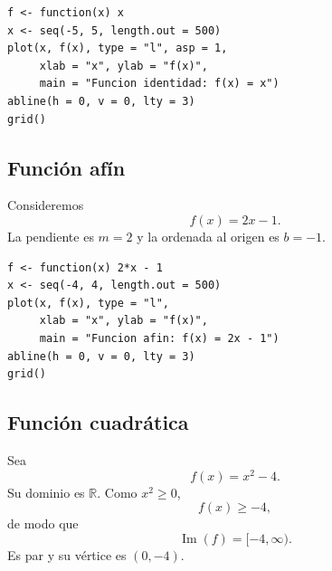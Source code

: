 \documentclass[12pt]{article}
\theoremstyle{remark}
\newcommand{\R}{\mathbb{R}}
\newcommand{\Ima}{\operatorname{Im}}
\begin{document}
\begin{verbatim}
f <- function(x) x
x <- seq(-5, 5, length.out = 500)
plot(x, f(x), type = "l", asp = 1,
     xlab = "x", ylab = "f(x)",
     main = "Funcion identidad: f(x) = x")
abline(h = 0, v = 0, lty = 3)
grid()
\end{verbatim}

\subsection*{Función afín}

Consideremos
\[
f(x)=2x-1.
\]
La pendiente es $m=2$ y la ordenada al origen es $b=-1$.

\begin{center}
\end{center}

\begin{verbatim}
f <- function(x) 2*x - 1
x <- seq(-4, 4, length.out = 500)
plot(x, f(x), type = "l",
     xlab = "x", ylab = "f(x)",
     main = "Funcion afin: f(x) = 2x - 1")
abline(h = 0, v = 0, lty = 3)
grid()
\end{verbatim}

\subsection*{Función cuadrática}

Sea
\[
f(x)=x^2-4.
\]
Su dominio es $\R$. Como $x^2\geq0$,
\[
f(x)\geq-4,
\]
de modo que
\[
\Ima(f)=[-4,\infty).
\]
Es par y su vértice es $(0,-4)$.

\begin{center}
\end{center}
\end{document}
